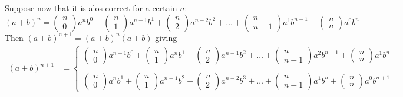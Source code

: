 Suppose now that it is alos correct for a certain $n$:
$$(a + b)^n =\left(\begin{matrix}n\\ 0\end{matrix}\right)a^{n}b^{0}+\left(\begin{matrix}n\\ 1\end{matrix}\right)a^{n-1}b^{1}+\left(\begin{matrix}n\\ 2\end{matrix}\right)a^{n-2}b^{2}+\dots +\left(\begin{matrix}n\\n-1\end{matrix}\right)a^{1}b^{n-1}+\left(\begin{matrix}n\\ n\end{matrix}\right)a^{0}b^{n}$$ 
Then $(a + b)^{n+1}= (a + b)^{n}(a+b)$ giving 
\begin{align*}
(a + b)^{n+1}&=\left\{\begin{array}{l}\left(\begin{matrix}n\\ 0\end{matrix}\right)a^{n+1}b^{0}+\left(\begin{matrix}n\\ 1\end{matrix}\right)a^{n}b^{1}+\left(\begin{matrix}n\\ 2\end{matrix}\right)a^{n-1}b^{2}+\dots +\left(\begin{matrix}n\\n-1\end{matrix}\right)a^{2}b^{n-1}+\left(\begin{matrix}n\\ n\end{matrix}\right)a^{1}b^{n}+\\\\
\left(\begin{matrix}n\\ 0\end{matrix}\right)a^{n}b^{1}+\left(\begin{matrix}n\\ 1\end{matrix}\right)a^{n-1}b^{2}+\left(\begin{matrix}n\\ 2\end{matrix}\right)a^{n-2}b^{3}+\dots +\left(\begin{matrix}n\\n-1\end{matrix}\right)a^{1}b^{n}+\left(\begin{matrix}n\\ n\end{matrix}\right)a^{0}b^{n+1}\end{array}
\right.
\end{align*}
